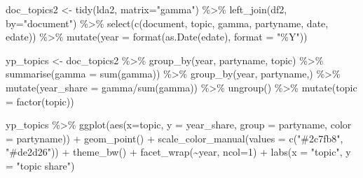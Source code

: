 \documentclass[
]{article}
\newenvironment{Shaded}{\begin{snugshade}}{\end{snugshade}}
\newcommand{\AttributeTok}[1]{\textcolor[rgb]{0.77,0.63,0.00}{#1}}
\newcommand{\DecValTok}[1]{\textcolor[rgb]{0.00,0.00,0.81}{#1}}
\newcommand{\FunctionTok}[1]{\textcolor[rgb]{0.00,0.00,0.00}{#1}}
\newcommand{\NormalTok}[1]{#1}
\newcommand{\OtherTok}[1]{\textcolor[rgb]{0.56,0.35,0.01}{#1}}
\newcommand{\SpecialCharTok}[1]{\textcolor[rgb]{0.00,0.00,0.00}{#1}}
\newcommand{\StringTok}[1]{\textcolor[rgb]{0.31,0.60,0.02}{#1}}
\begin{document}
\begin{Shaded}
\begin{Highlighting}[]
\NormalTok{doc\_topics2 }\OtherTok{\textless{}{-}} \FunctionTok{tidy}\NormalTok{(lda2, }\AttributeTok{matrix=}\StringTok{"gamma"}\NormalTok{) }\SpecialCharTok{\%\textgreater{}\%}
  \FunctionTok{left\_join}\NormalTok{(df2, }\AttributeTok{by=}\StringTok{"document"}\NormalTok{) }\SpecialCharTok{\%\textgreater{}\%}
  \FunctionTok{select}\NormalTok{(}\FunctionTok{c}\NormalTok{(document, topic, gamma, partyname, date, edate)) }\SpecialCharTok{\%\textgreater{}\%}
  \FunctionTok{mutate}\NormalTok{(}\AttributeTok{year =} \FunctionTok{format}\NormalTok{(}\FunctionTok{as.Date}\NormalTok{(edate), }\AttributeTok{format =} \StringTok{"\%Y"}\NormalTok{))}

\NormalTok{yp\_topics }\OtherTok{\textless{}{-}}\NormalTok{ doc\_topics2 }\SpecialCharTok{\%\textgreater{}\%}
  \FunctionTok{group\_by}\NormalTok{(year, partyname, topic) }\SpecialCharTok{\%\textgreater{}\%}
  \FunctionTok{summarise}\NormalTok{(}\AttributeTok{gamma =} \FunctionTok{sum}\NormalTok{(gamma)) }\SpecialCharTok{\%\textgreater{}\%}
  \FunctionTok{group\_by}\NormalTok{(year, partyname,) }\SpecialCharTok{\%\textgreater{}\%}
  \FunctionTok{mutate}\NormalTok{(}\AttributeTok{year\_share =}\NormalTok{ gamma}\SpecialCharTok{/}\FunctionTok{sum}\NormalTok{(gamma)) }\SpecialCharTok{\%\textgreater{}\%}
  \FunctionTok{ungroup}\NormalTok{() }\SpecialCharTok{\%\textgreater{}\%}
  \FunctionTok{mutate}\NormalTok{(}\AttributeTok{topic =} \FunctionTok{factor}\NormalTok{(topic))}

\NormalTok{yp\_topics }\SpecialCharTok{\%\textgreater{}\%}
  \FunctionTok{ggplot}\NormalTok{(}\FunctionTok{aes}\NormalTok{(}\AttributeTok{x=}\NormalTok{topic, }\AttributeTok{y =}\NormalTok{ year\_share, }\AttributeTok{group =}\NormalTok{ partyname, }\AttributeTok{color =}\NormalTok{ partyname)) }\SpecialCharTok{+}
  \FunctionTok{geom\_point}\NormalTok{() }\SpecialCharTok{+}
  \FunctionTok{scale\_color\_manual}\NormalTok{(}\AttributeTok{values =} \FunctionTok{c}\NormalTok{(}\StringTok{"\#2c7fb8"}\NormalTok{, }\StringTok{"\#de2d26"}\NormalTok{)) }\SpecialCharTok{+}
  \FunctionTok{theme\_bw}\NormalTok{() }\SpecialCharTok{+}
  \FunctionTok{facet\_wrap}\NormalTok{(}\SpecialCharTok{\textasciitilde{}}\NormalTok{year, }\AttributeTok{ncol=}\DecValTok{1}\NormalTok{) }\SpecialCharTok{+}
  \FunctionTok{labs}\NormalTok{(}\AttributeTok{x =} \StringTok{"topic"}\NormalTok{, }\AttributeTok{y =} \StringTok{"topic share"}\NormalTok{)}
\end{Highlighting}
\end{Shaded}
\end{document}
